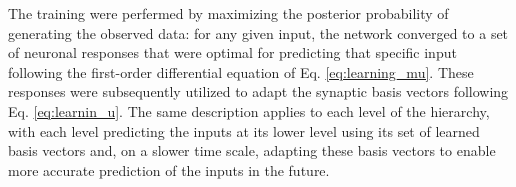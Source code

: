 \documentclass[10pt]{article}
\begin{document}
\begin{comment}
\begin{figure}[!h]
    \centering
    \texttt{[image: natural\_images\_with\_rf.png]}
    \caption{Natural images used to train the model. In the bottom right corner are represented relative sizes ($16 \times 16$ and $16 \times 26$) of level-1 and level-2 receptive fields. These images were first filtered using a center-surround difference-of-Gaussians operator to approximate processing at the levels of the retina and the LGN \citep{Olshausen1997}}
    \label{fig:natural_images}
\end{figure}
\end{comment}

The training were perfermed by maximizing the posterior probability of generating the observed data: for any given input, the network converged to a set of neuronal responses that were optimal for predicting that specific input following the first-order differential equation of Eq. \ref{eq:learning_mu}. These responses were subsequently utilized to adapt the synaptic basis vectors following Eq. \ref{eq:learnin_u}. The same description applies to each level of the hierarchy, with each level predicting the inputs at its lower level using its set of learned basis vectors and, on a slower time scale, adapting these basis vectors to enable more accurate prediction of the inputs in the future.
\end{document}
